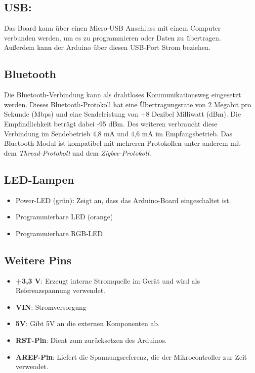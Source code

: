 \subsection{USB:}
Das Board kann über einen Micro-USB Anschluss mit einem Computer verbunden werden, um es zu programmieren oder Daten zu übertragen. Außerdem kann der Arduino über diesen USB-Port Strom beziehen.

\subsection{Bluetooth}
Die Bluetooth-Verbindung kann als drahtloses Kommunikationsweg eingesetzt werden. Dieses Bluetooth-Protokoll hat eine Übertragungsrate von 2 Megabit pro Sekunde (Mbps) und eine Sendeleistung von +8 Dezibel Milliwatt (dBm). Die Empfindlichkeit beträgt dabei -95 dBm. Des weiteren verbraucht diese Verbindung im Sendebetrieb 4,8 mA und 4,6 mA im Empfangsbetrieb. Das Bluetooth Modul ist kompatibel mit mehreren Protokollen unter anderem mit dem \textit{Thread-Protokoll} und dem \textit{Zigbee-Protokoll}.\cite{Ard.2024}
\subsection{LED-Lampen}
	\begin{itemize}
		\item Power-LED (grün): Zeigt an, dass das Arduino-Board eingeschaltet ist.
		\item Programmierbare LED (orange)
		\item Programmierbare RGB-LED
	\end{itemize}
\subsection{Weitere Pins}
\begin{itemize}
	\item \textbf{+3,3 V}: Erzeugt interne Stromquelle im Gerät und wird als Referenzspannung verwendet.
	\item \textbf{VIN}: Stromversorgung
	\item \textbf{5V}: Gibt 5V an die externen Komponenten ab. 
	\item \textbf{RST-Pin}: Dient zum zurücksetzen des Arduinos.
	\item \textbf{AREF-Pin}: Liefert die Spannungsreferenz, die der Mikrocontroller zur Zeit verwendet.\cite{Ard.2024}
\end{itemize}
